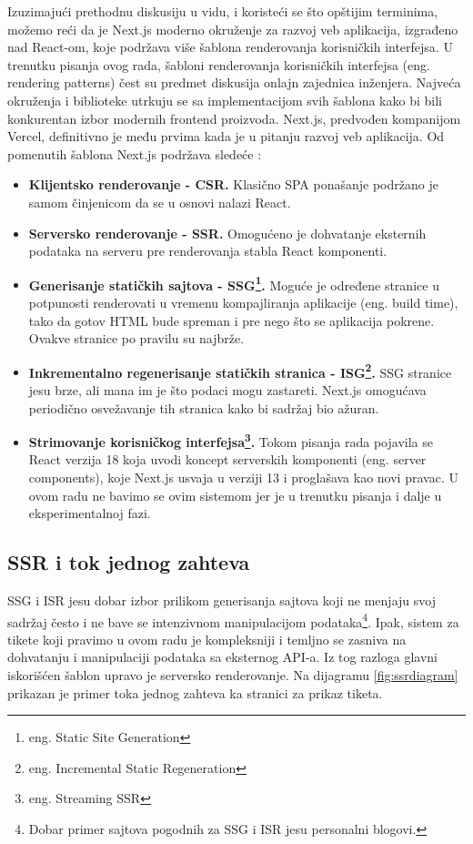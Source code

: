 \documentclass[12pt,oneside]{memoir}
\begin{document}
Izuzimajući prethodnu diskusiju u vidu, i koristeći se što opštijim terminima, možemo reći da je Next.js moderno okruženje za razvoj veb aplikacija, izgrađeno nad React-om, koje podržava više šablona renderovanja korisničkih interfejsa. U trenutku pisanja ovog rada, šabloni renderovanja korisničkih interfejsa (eng. rendering patterns) čest su predmet diskusija onlajn zajednica inženjera. Najveća okruženja i biblioteke utrkuju se sa implementacijom svih šablona kako bi bili konkurentan izbor modernih frontend proizvoda. Next.js, predvođen kompanijom Vercel, definitivno je među prvima kada je u pitanju razvoj veb aplikacija. Od pomenutih šablona Next.js podržava sledeće \cite{nextjsdocs}:
\begin{itemize}
    \item \textbf{Klijentsko renderovanje - CSR.} Klasično SPA ponašanje podržano je samom činjenicom da se u osnovi nalazi React.
    \item \textbf{Serversko renderovanje - SSR.} Omogućeno je dohvatanje eksternih podataka na serveru pre renderovanja stabla React komponenti.
    \item \textbf{Generisanje statičkih sajtova - SSG\footnote{eng. Static Site Generation}.} Moguće je određene stranice u potpunosti renderovati u vremenu kompajliranja aplikacije (eng. build time), tako da gotov HTML bude spreman i pre nego što se aplikacija pokrene. Ovakve stranice po pravilu su najbrže.
    \item \textbf{Inkrementalno regenerisanje statičkih stranica - ISG\footnote{eng. Incremental Static Regeneration}.} SSG stranice jesu brze, ali mana im je što podaci mogu zastareti. Next.js omogućava periodično osvežavanje tih stranica kako bi sadržaj bio ažuran.
    \item \textbf{Strimovanje korisničkog interfejsa\footnote{eng. Streaming SSR}.} Tokom pisanja rada pojavila se React verzija 18 koja uvodi koncept serverskih komponenti (eng. server components), koje Next.js usvaja u verziji 13 i proglašava kao novi pravac. U ovom radu ne bavimo se ovim sistemom jer je u trenutku pisanja i dalje u eksperimentalnoj fazi.
\end{itemize}

\subsection{SSR i tok jednog zahteva}

SSG i ISR jesu dobar izbor prilikom generisanja sajtova koji ne menjaju svoj sadržaj često i ne bave se intenzivnom manipulacijom podataka\footnote{Dobar primer sajtova pogodnih za SSG i ISR jesu personalni blogovi.}. Ipak, sistem za tikete koji pravimo u ovom radu je kompleksniji i temljno se zasniva na dohvatanju i manipulaciji podataka sa eksternog API-a. Iz tog razloga glavni iskorišćen šablon upravo je serversko renderovanje. Na dijagramu \ref{fig:ssrdiagram} prikazan je primer toka jednog zahteva ka stranici za prikaz tiketa.
\end{document}
